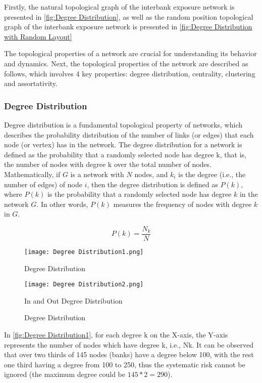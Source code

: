 Firstly, the natural topological graph of the interbank exposure network is presented in \ref{fig:Degree Distribution}, as well as the random position topological graph of the interbank exposure network is presented in \ref{fig:Degree Distribution with Random Layout}

The topological properties of a network are crucial for understanding its behavior and dynamics. Next, the topological properties of the network are described as follows, which involves 4 key properties: degree distribution, centrality, clustering and assortativity.

\subsubsection{Degree Distribution}
Degree distribution is a fundamental topological property of networks, which describes the probability distribution of the number of links (or edges) that each node (or vertex) has in the network. The degree distribution for a network is defined as the probability that a randomly selected node has degree k, that is, the number of nodes with degree k over the total number of nodes. Mathematically, if $G$ is a network with $N$ nodes, and $k_i$ is the degree (i.e., the number of edges) of node $i$, then the degree distribution is defined as $P(k)$, where $P(k)$ is the probability that a randomly selected node has degree $k$ in the network $G$. In other words, $P(k)$ measures the frequency of nodes with degree $k$ in $G$.

\[
    P(k) = \frac{N_k}{N}
\]

\begin{figure}[H]
    \centering
    \begin{minipage}{0.49\textwidth}
    \centering
    \texttt{[image: Degree Distribution1.png]}
    \caption{Degree Distribution}\label{fig:Degree Distribution1}
    \end{minipage}
    \centering
    \begin{minipage}{0.49\textwidth}
    \centering
    \texttt{[image: Degree Distribution2.png]}
    \caption{In and Out Degree Distribution}\label{fig:Degree Distribution2}
    \end{minipage}
    \caption{Degree Distribution}
\end{figure}

In \ref{fig:Degree Distribution1}, for each degree k on the X-axis, the Y-axis represents the number of nodes which have degree k, i.e., Nk. It can be observed that over two thirds of 145 nodes (banks) have a degree below 100, with the rest one third having a degree from 100 to 250, thus the systematic risk cannot be ignored (the maximum degree could be $145*2=290$).

